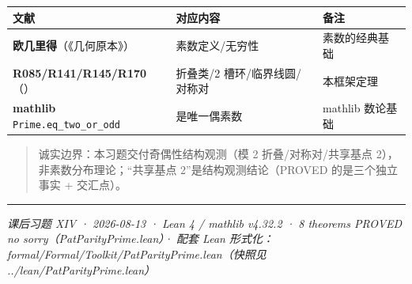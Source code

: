 \documentclass[
]{article}
\newcounter{none} %
\begin{document}
{\def\LTcaptype{none} %
\begin{longtable}[]{@{}
 >{\raggedright\arraybackslash}p{}
 >{\raggedright\arraybackslash}p{}
 >{\raggedright\arraybackslash}p{}@{}}
\toprule\noalign{}
\begin{minipage}[b]{\linewidth}\raggedright
文献
\end{minipage} & \begin{minipage}[b]{\linewidth}\raggedright
对应内容
\end{minipage} & \begin{minipage}[b]{\linewidth}\raggedright
备注
\end{minipage} \\
\midrule\noalign{}
\endhead
\bottomrule\noalign{}
\endlastfoot
\textbf{欧几里得}（《几何原本》） & 素数定义/无穷性 & 素数的经典基础 \\
\textbf{R085/R141/R145/R170}（） & 折叠类/2 槽环/临界线圆/对称对 &
本框架定理 \\
\textbf{mathlib} \texttt{Prime.eq\_two\_or\_odd} & 2 是唯一偶素数 &
mathlib 数论基础 \\
\end{longtable}
}

\begin{quote}
诚实边界：本习题交付奇偶性结构观测（模 2 折叠/对称对/共享基点
2），非素数分布理论；``共享基点 2''是结构观测结论（PROVED
的是三个独立事实 + 交汇点）。
\end{quote}

\begin{center}\rule{0.5\linewidth}{0.5pt}\end{center}

\emph{课后习题 XIV · 2026-08-13 · Lean 4 / mathlib v4.32.2 · 8
theorems PROVED no sorry（PatParityPrime.lean）· 配套 Lean
形式化：formal/Formal/Toolkit/PatParityPrime.lean（快照见
../lean/PatParityPrime.lean）}
\end{document}
